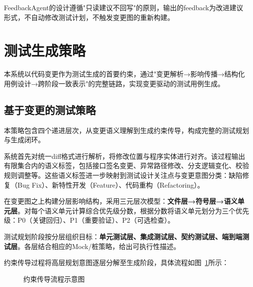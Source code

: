 FeedbackAgent的设计遵循"只读建议不回写"的原则，输出的feedback为改进建议形式，不自动修改测试计划，不触发变更图的重新构建。

\section{测试生成策略}\label{sec:generation_strategy}

本系统以代码变更作为测试生成的首要约束，通过"变更解析→影响传播→结构化用例设计→跨阶段一致表示"的完整链路，实现变更驱动的测试用例生成。

\subsection{基于变更的测试策略}\label{sec:change_based_strategy}
本策略包含四个递进层次，从变更语义理解到生成约束传导，构成完整的测试规划与生成闭环。

系统首先对统一diff格式进行解析，将修改位置与程序实体进行对齐。该过程输出有限集合内的语义标签，包括接口签名变更、异常路径修改、分支逻辑变化、校验规则调整等。这些语义标签进一步映射到测试设计关注点与变更意图分类：缺陷修复（Bug Fix）、新特性开发（Feature）、代码重构（Refactoring）。

在变更图之上构建分层影响结构，采用三元层次模型：\textbf{文件层→符号层→语义单元层}。对每个语义单元计算综合优先级分数，根据分数将语义单元划分为三个优先级：P0（关键回归）、P1（重要验证）、P2（可选检查）。

测试规划阶段按分层组织目标：\textbf{单元测试层、集成测试层、契约测试层、端到端测试层}。各层结合相应的Mock/桩策略，给出可执行性描述。

约束传导过程将高层规划意图逐层分解至生成阶段，具体流程如图~\ref{fig:constraint_propagation}所示：

\begin{figure}[htbp]
\centering
{}
\caption{约束传导流程示意图}
\label{fig:constraint_propagation}
\end{figure}

